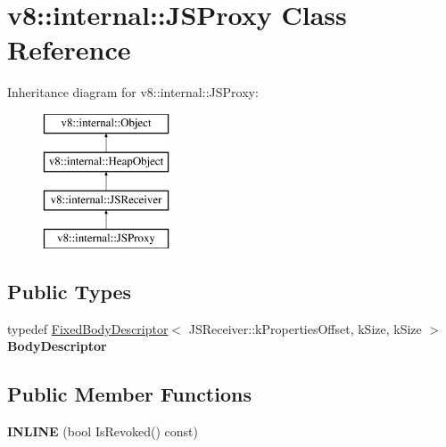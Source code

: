 \hypertarget{classv8_1_1internal_1_1_j_s_proxy}{}\section{v8\+:\+:internal\+:\+:J\+S\+Proxy Class Reference}
\label{classv8_1_1internal_1_1_j_s_proxy}
Inheritance diagram for v8\+:\+:internal\+:\+:J\+S\+Proxy\+:\begin{figure}[H]
\begin{center}
\leavevmode
\includegraphics[height=4.000000cm]{classv8_1_1internal_1_1_j_s_proxy}
\end{center}
\end{figure}
\subsection*{Public Types}
\begin{DoxyCompactItemize}
\item 
typedef \hyperlink{classv8_1_1internal_1_1_fixed_body_descriptor}{Fixed\+Body\+Descriptor}$<$ J\+S\+Receiver\+::k\+Properties\+Offset, k\+Size, k\+Size $>$ {\bfseries Body\+Descriptor}\hypertarget{classv8_1_1internal_1_1_j_s_proxy_aa5000a1747318465c60d6a11325e5e6d}{}\label{classv8_1_1internal_1_1_j_s_proxy_aa5000a1747318465c60d6a11325e5e6d}

\end{DoxyCompactItemize}
\subsection*{Public Member Functions}
\begin{DoxyCompactItemize}
\item 
{\bfseries I\+N\+L\+I\+NE} (bool Is\+Revoked() const)\hypertarget{classv8_1_1internal_1_1_j_s_proxy_a168ff540da3e094429f657355c012041}{}\label{classv8_1_1internal_1_1_j_s_proxy_a168ff540da3e094429f657355c012041}

\end{DoxyCompactItemize}
